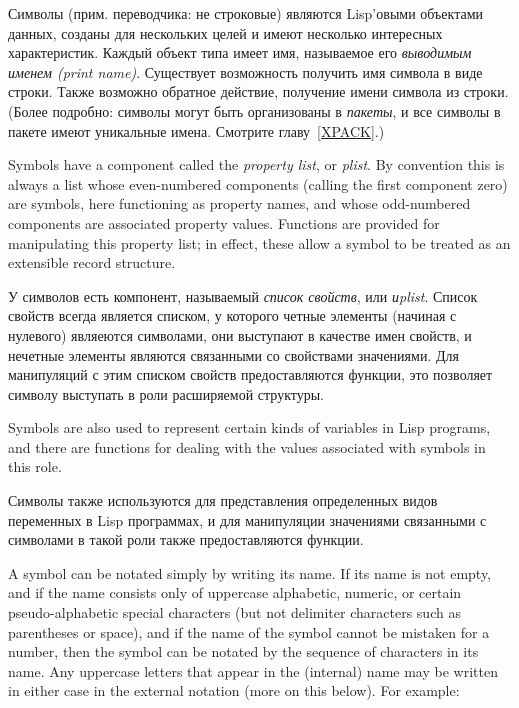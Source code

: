 Символы (прим. переводчика: не строковые) являются Lisp'овыми объектами данных,
созданы для нескольких целей и имеют несколько интересных характеристик. Каждый
объект типа  имеет имя, называемое его {\it выводимым именем (print
  name)}. Существует возможность получить имя символа в виде строки. Также
возможно обратное действие, получение имени символа из строки. (Более подробно:
символы могут быть организованы в {\it пакеты}, и все символы в пакете имеют
уникальные имена. Смотрите главу~\ref{XPACK}.)

Symbols have a component called the {\it property list}, or {\it plist}.
By convention this is always a list whose even-numbered
components (calling the first component zero) are symbols,
here functioning as property names, and whose odd-numbered components
are associated property values.  Functions are provided for manipulating
this property list; in effect, these allow a symbol to be treated as an
extensible record structure.

У символов есть компонент, называемый {\it список свойств}, или {\it иplist}.
Список свойств всегда является списком, у которого четные элементы (начиная с
нулевого) являеются символами, они выступают в качестве имен свойств, и нечетные
элементы являются связанными со свойствами значениями. Для манипуляций с этим
списком свойств предоставляются функции, это позволяет символу выступать в роли расширяемой структуры.

Symbols are also used to represent certain kinds of variables in Lisp
programs, and there are functions for dealing with the values associated
with symbols in this role. 

Символы также используются для представления определенных видов переменных в
Lisp программах, и для манипуляции значениями связанными с символами в такой
роли также предоставляются функции.

A symbol can be notated simply by writing its name.
If its name is not empty, and if the name consists only of
uppercase alphabetic, numeric, or certain pseudo-alphabetic
special characters (but not
delimiter characters such as parentheses or space), and if
the name of the symbol cannot be mistaken for a number, then
the symbol can be notated by the sequence of characters in its name.
Any uppercase letters that appear in the (internal) name may
be written in either case in the external notation (more on this below).
For example:

